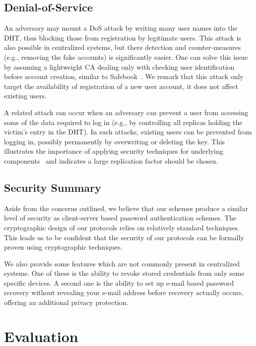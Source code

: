 \subsection{Denial-of-Service}

An adversary may mount a DoS attack by writing many user names into the DHT,
thus blocking those from registration by legitimate users. This attack is also
possible in centralized systems, but there detection and counter-measures
(e.g., removing the fake accounts) is significantly easier. One can solve this
issue by assuming a lightweight CA dealing only with checking user
identification before account creation, similar to Safebook~\cite{CutilloMS09}.
We remark that this attack only target the availability of registration of a
new user account, it does not affect existing users.

A related attack can occur when an adversary can prevent a user from accessing
some of the data required to log in (e.g., by controlling all replicas holding
the victim's entry in the DHT). In such attacks, existing users can be
prevented from logging in, possibly permanently by overwriting or deleting the
key. This illustrates the importance of applying security techniques for
underlying components~\cite{UrdanetaPS11} and indicates a large replication
factor should be chosen.

\subsection{Security Summary}

Aside from the concerns outlined, we believe that our schemes produce a
similar level of security as client-server based password authentication
schemes. The cryptographic design of our protocols relies on
relatively standard techniques. This leads us to be confident that the
security of our protocols can be formally proven using cryptographic
techniques.

We also provide some features which are not commonly present in centralized
systems. One of these is the ability to revoke stored credentials from only
some specific devices. A second one is the ability to set up e-mail based
password recovery without revealing your e-mail address before recovery
actually occurs, offering an additional privacy protection.

\section{Evaluation} 

